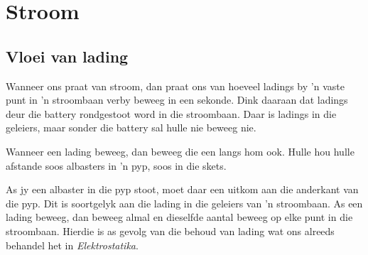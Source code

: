 \section{Stroom}

\subsection*{Vloei van lading}

Wanneer ons praat van stroom, dan praat ons van hoeveel ladings by  'n vaste punt
in  'n stroombaan verby beweeg in een sekonde. Dink daaraan dat ladings deur die
battery rondgestoot word in die stroombaan. Daar is ladings in die geleiers,
maar sonder die battery sal hulle nie beweeg nie.\\
\begin{minipage}{.5\textwidth}
Wanneer een lading beweeg, dan beweeg die een langs hom ook. Hulle hou hulle
afstande soos albasters in  'n pyp, soos in die skets.
\begin{center}
\end{center}
As jy een albaster in die pyp stoot, moet daar een uitkom aan die anderkant van
die pyp. Dit is soortgelyk aan die lading in die geleiers van  'n stroombaan. As
een lading beweeg, dan beweeg almal en dieselfde aantal beweeg op elke punt in
die stroombaan. Hierdie is as gevolg van die behoud van lading wat ons alreeds
behandel het in \textsl{Elektrostatika}.
 \end{minipage}
